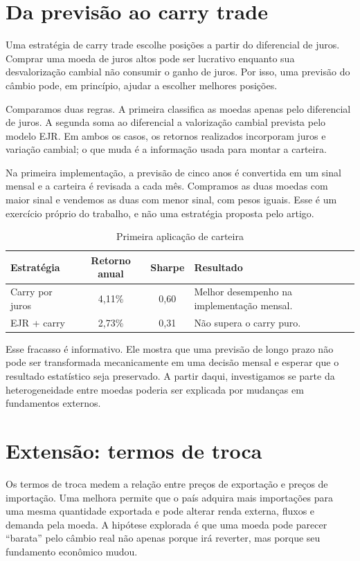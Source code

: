 \documentclass[11pt,a4paper]{article}
\begin{document}
\section{Da previsão ao carry trade}

Uma estratégia de carry trade escolhe posições a partir do diferencial de juros. Comprar uma moeda de juros altos pode ser lucrativo enquanto sua desvalorização cambial não consumir o ganho de juros. Por isso, uma previsão do câmbio pode, em princípio, ajudar a escolher melhores posições.

Comparamos duas regras. A primeira classifica as moedas apenas pelo diferencial de juros. A segunda soma ao diferencial a valorização cambial prevista pelo modelo EJR. Em ambos os casos, os retornos realizados incorporam juros e variação cambial; o que muda é a informação usada para montar a carteira.

Na primeira implementação, a previsão de cinco anos é convertida em um sinal mensal e a carteira é revisada a cada mês. Compramos as duas moedas com maior sinal e vendemos as duas com menor sinal, com pesos iguais. Esse é um exercício próprio do trabalho, e não uma estratégia proposta pelo artigo.

\begin{table}[htbp]
\centering
\caption{Primeira aplicação de carteira}
\begin{tabular}{lccp{5.4cm}}
\toprule
\textbf{Estratégia} & \textbf{Retorno anual} & \textbf{Sharpe} & \textbf{Resultado} \\
\midrule
Carry por juros & 4,11\% & 0,60 & Melhor desempenho na implementação mensal. \\
EJR + carry & 2,73\% & 0,31 & Não supera o carry puro. \\
\bottomrule
\end{tabular}
\end{table}

Esse fracasso é informativo. Ele mostra que uma previsão de longo prazo não pode ser transformada mecanicamente em uma decisão mensal e esperar que o resultado estatístico seja preservado. A partir daqui, investigamos se parte da heterogeneidade entre moedas poderia ser explicada por mudanças em fundamentos externos.

\section{Extensão: termos de troca}

Os termos de troca medem a relação entre preços de exportação e preços de importação. Uma melhora permite que o país adquira mais importações para uma mesma quantidade exportada e pode alterar renda externa, fluxos e demanda pela moeda. A hipótese explorada é que uma moeda pode parecer ``barata'' pelo câmbio real não apenas porque irá reverter, mas porque seu fundamento econômico mudou.
\end{document}

